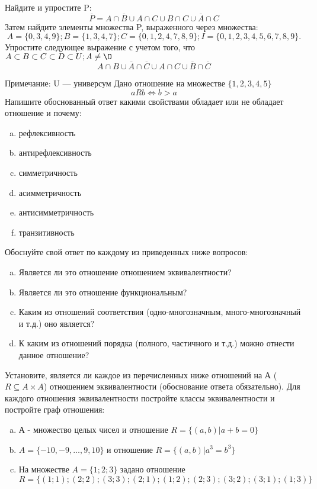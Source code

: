 \documentclass[10pt]{exam}
\begin{document}
\begin{questions}
\question
Найдите и упростите P:
\begin{equation*}
\overline{P} = A \cap \overline{B} \cup A \cap C \cup B \cap C \cup \overline{A} \cap C
\end{equation*}
Затем найдите элементы множества P, выраженного через множества:
\begin{equation*}
A = \{0, 3, 4, 9\}; 
B = \{1, 3, 4, 7\};
C = \{0, 1, 2, 4, 7, 8, 9\};
I = \{0, 1, 2, 3, 4, 5, 6, 7, 8, 9\}.
\end{equation*}\question
Упростите следующее выражение с учетом того, что $A\subset B \subset C \subset D \subset U; A \neq \O$
\begin{equation*}
A \cap B \cup \overline{A} \cap \overline{C} \cup A \cap C \cup \overline{B} \cap \overline{C}
\end{equation*}

Примечание: U — универсум\question
Дано отношение на множестве $\{1, 2, 3, 4, 5\}$ 
\begin{equation*}
aRb \iff b > a
\end{equation*}
Напишите обоснованный ответ какими свойствами обладает или не обладает отношение и почему:   
\begin{enumerate} [a)]\setcounter{enumi}{0}
\item рефлексивность
\item антирефлексивность
\item симметричность
\item асимметричность
\item антисимметричность
\item транзитивность
\end{enumerate}

Обоснуйте свой ответ по каждому из приведенных ниже вопросов:
\begin{enumerate} [a)]\setcounter{enumi}{0}
    \item Является ли это отношение отношением эквивалентности?
    \item Является ли это отношение функциональным?
    \item Каким из отношений соответствия (одно-многозначным, много-многозначный и т.д.) оно является?
    \item К каким из отношений порядка (полного, частичного и т.д.) можно отнести данное отношение?
\end{enumerate}

\question
Установите, является ли каждое из перечисленных ниже отношений на А ($R \subseteq A \times A$) отношением эквивалентности (обоснование ответа обязательно). Для каждого отношения эквивалентности 
постройте классы эквивалентности и постройте граф отношения:
\begin{enumerate}[a)]\setcounter{enumi}{0}
\item А - множество целых чисел и отношение $R = \{(a,b)|a + b = 0\}$
\item $A = \{-10, -9, …, 9, 10\}$ и отношение $R = \{(a,b)|a^{3} = b^{3}\}$
\item На множестве $A = \{1; 2; 3\}$ задано отношение $R = \{(1; 1); (2; 2); (3; 3); (2; 1); (1; 2); (2; 3); (3; 2); (3; 1); (1; 3)\}$


\end{enumerate}
\end{questions}
\end{document}
